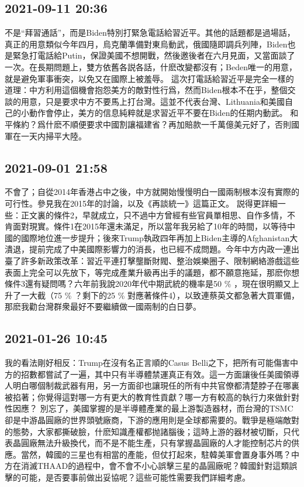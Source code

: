 \documentclass[twocolumn]{ctexart}
\begin{document}
\subsection*{2021-09-11 20:36}

不是“拜習通話”，而是Biden特別打緊急電話給習近平。其他的話題都是過場話，真正的用意類似今年四月，烏克蘭準備對東烏動武，俄國隨即調兵列陣，Biden也是緊急打電話給Putin，保證美國不想開戰，然後邀後者在六月見面，又當面談了一次。在長期問題上，雙方依舊各説各話，什麽改變都沒有；Beden唯一的用意，就是避免軍事衝突，以免又在國際上被羞辱。
這次打電話給習近平是完全一樣的道理：中方利用這個機會抱怨美方的敵對性行爲，然而Biden根本不在乎，整個交談的用意，只是要求中方不要馬上打台灣。這並不代表台灣、Lithuania和美國自己的小動作會停止，美方的信息純粹就是求習近平不要在Biden的任期内動武。
和平條約？爲什麽不順便要求中國割讓福建省？再加賠款一千萬億美元好了，否則國軍在一天内掃平大陸。
\subsection*{2021-09-01 21:58}

不會了；自從2014年香港占中之後，中方就開始慢慢明白一國兩制根本沒有實際的可行性。參見我在2015年的討論，以及《再談統一》這篇正文。
説得更詳細一些：正文裏的條件2，早就成立，只不過中方曾經有些官員單相思、自作多情，不肯面對現實。條件1在2015年還未滿足，所以當年我另給了10年的時間，以等待中國的國際地位進一步提升；後來Trump執政四年再加上Biden主導的Afghanistan大潰退，提前完成了中美國際影響力的消長，也已經不成問題。今年中方内政一連出臺了許多新政策改革：習近平連打擊壟斷財閥、整治娛樂圈子、限制網絡游戲這些表面上完全可以先放下，等完成產業升級再出手的議題，都不願意拖延，那麽你想條件3還有疑問嗎？六年前我說2020年代中期武統的機率是50 \% ，現在很明顯又上升了一大截（75 \% ？剩下的25 \% 對應著條件4），以致連蔡英文都急著大買軍備，那麽我勸台灣群衆最好不要繼續做一國兩制的白日夢。
\subsection*{2021-01-26 10:45}

我的看法剛好相反：Trump在沒有名正言順的Casus Belli之下，把所有可能傷害中方的招數都嘗試了一遍，其中只有半導體禁運真正有效。這一方面讓後任美國領導人明白哪個制裁武器有用，另一方面卻也讓現任的所有中共官僚都清楚脖子在哪裏被掐著；你覺得這對哪一方有更大的教育性貢獻？哪一方有較高的執行力來做針對性因應？
別忘了，美國掌握的是半導體產業的最上游製造器材，而台灣的TSMC卻是中游晶圓廠的世界頭號廠商，下游的應用則是全球都需要的。戰爭是極端敵對的態勢，大家都撕破臉，什麽知識產權都抛諸腦後；這時上游的器材被切斷，只代表晶圓廠無法升級換代，而不是不能生產，只有掌握晶圓廠的人才能控制芯片的供應。當然，韓國的三星也有相當的產能，但仗打起來，駐韓美軍會置身事外嗎？中方在消滅THAAD的過程中，會不會不小心誤擊三星的晶圓廠呢？韓國針對這類誤擊的可能，是否要事前做出妥協呢？這些可能性需要我們詳細考慮。
\end{document}
